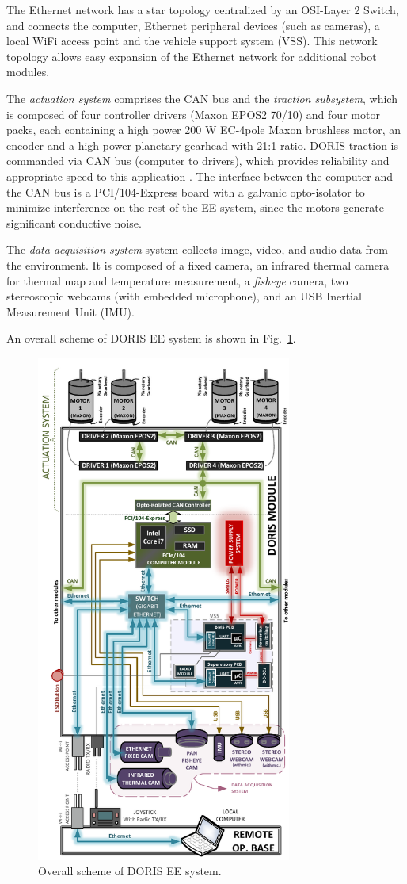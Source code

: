 \documentclass{ifacconf}
\begin{document}
The Ethernet network has a star topology centralized by an OSI-Layer 2 Switch,
and connects the computer, Ethernet peripheral devices (such as cameras), a
local WiFi access point and the vehicle support system (VSS). This network
topology allows easy expansion of the Ethernet network for additional robot
modules. 

The \emph{actuation system} comprises the CAN bus and the \emph{traction
subsystem}, which is composed of four controller drivers (Maxon EPOS2 70/10) and
four motor packs, each containing a high power 200 W EC-4pole Maxon brushless
motor, an encoder and a high power planetary gearhead with 21:1 ratio. DORIS
traction is commanded via CAN bus (computer to drivers), which provides
reliability and appropriate speed to this application \citep{can}. The
interface between the computer and the CAN bus is a PCI/104-Express board with
a galvanic opto-isolator to minimize interference on the rest of the EE system,
since the motors generate significant conductive noise.
 
The \emph{data acquisition system} system collects image, video, and audio data
from the environment. It is composed of a fixed camera, an infrared thermal
camera for thermal map and temperature measurement, a \emph{fisheye} camera, two
stereoscopic webcams (with embedded microphone), and an USB Inertial Measurement Unit (IMU).

An overall scheme of DORIS EE system is shown in
Fig.~\ref{fig:EE-Communications}.

\begin{figure}
\centering
\includegraphics[width=8.4cm]{figs/EE-Communications-Geral.pdf}
\caption{Overall scheme of DORIS EE system.}
\label{fig:EE-Communications}
\end{figure} 
\end{document}
